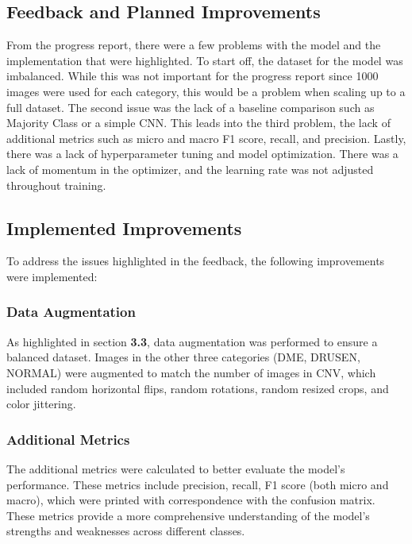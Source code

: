\documentclass[11pt]{article}
\begin{document}
\subsection{Feedback and Planned Improvements}

From the progress report, there were a few problems with the model and the implementation that were highlighted. To start off, the dataset for the model was imbalanced. While this was not important for the progress report since 1000 images were used for each category, this would be a problem when scaling up to a full dataset. The second issue was the lack of a baseline comparison such as Majority Class or a simple CNN. This leads into the third problem, the lack of additional metrics such as micro and macro F1 score, recall, and precision. Lastly, there was a lack of hyperparameter tuning and model optimization. There was a lack of momentum in the optimizer, and the learning rate was not adjusted throughout training.

\subsection{Implemented Improvements}

To address the issues highlighted in the feedback, the following improvements were implemented:

\subsubsection{Data Augmentation}

As highlighted in section \textbf{3.3}, data augmentation was performed to ensure a balanced dataset. Images in the other three categories (DME, DRUSEN, NORMAL) were augmented to match the number of images in CNV, which included random horizontal flips, random rotations, random resized crops, and color jittering.

\subsubsection{Additional Metrics}

The additional metrics were calculated to better evaluate the model's performance. These metrics include precision, recall, F1 score (both micro and macro), which were printed with correspondence with the confusion matrix. These metrics provide a more comprehensive understanding of the model's strengths and weaknesses across different classes.
\end{document}
